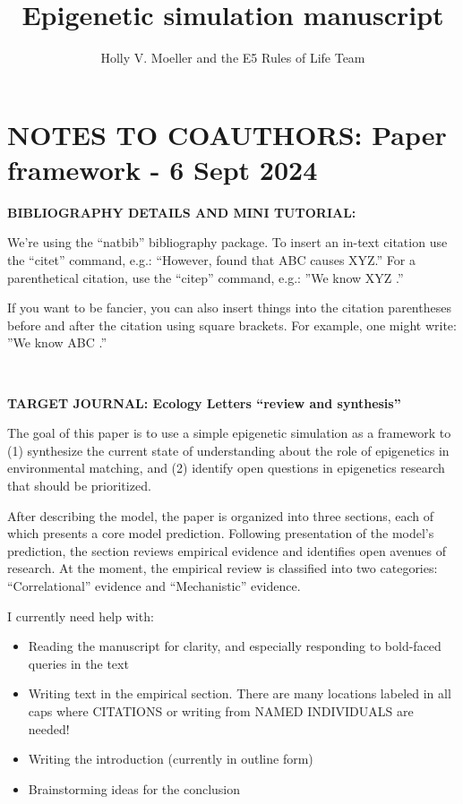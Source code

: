 \documentclass{article}
\title{Epigenetic simulation manuscript}
\author{Holly V. Moeller and the E5 Rules of Life Team }
\date{}
\begin{document}
\maketitle

\section*{NOTES TO COAUTHORS: Paper framework - 6 Sept 2024}


\noindent \textbf{BIBLIOGRAPHY DETAILS AND MINI TUTORIAL:}

We're using the ``natbib'' bibliography package. To insert an in-text citation use the ``citet'' command, e.g.: ``However, \citet{liew2018epigenome} found that ABC causes XYZ.'' For a parenthetical citation, use the ``citep'' command, e.g.: ''We know XYZ \citep{liew2018epigenome}.''

If you want to be fancier, you can also insert things into the citation parentheses before and after the citation using square brackets. For example, one might write: ''We know ABC \citep[see, e.g.,][]{liew2018epigenome}.''

\ 




\noindent \textbf{TARGET JOURNAL: Ecology Letters ``review and synthesis''}   

The goal of this paper is to use a simple epigenetic simulation as a framework to (1) synthesize the current state of understanding about the role of epigenetics in environmental matching, and (2) identify open questions in epigenetics research that should be prioritized. 

After describing the model, the paper is organized into three sections, each of which presents a core model prediction. Following presentation of the model's prediction, the section reviews empirical evidence and identifies open avenues of research. At the moment, the empirical review is classified into two categories: ``Correlational'' evidence and ``Mechanistic'' evidence.

I currently need help with:
\begin{itemize}
    \item Reading the manuscript for clarity, and especially responding to bold-faced queries in the text
    \item Writing text in the empirical section. There are many locations labeled in all caps where CITATIONS or writing from NAMED INDIVIDUALS are needed!
    \item Writing the introduction (currently in outline form)
    \item Brainstorming ideas for the conclusion
\end{itemize}
\end{document}
